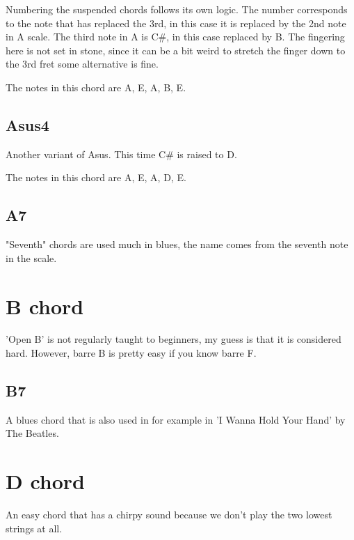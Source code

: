 \documentclass[11pt]{book}
\begin{document}
    Numbering the suspended chords follows its own logic.
    The number corresponds to the note that has replaced the 3rd, in this case it is replaced by the 2nd note in A scale.
    The third note in A is C\#, in this case replaced by B.
    The fingering here is not set in stone, since it can be a bit weird to stretch the finger down to the 3rd fret some alternative is fine.


    \chordscheme[
    name = Asus2,
    finger = {2/4:2,2/3:3},
    mute = {6},
    ring = {5,2,1}
    ]

    The notes in this chord are A, E, A, B, E.

    \subsection{Asus4}
    Another variant of Asus.
    This time C\# is raised to D.

    \chordscheme[
    name = Asus4,
    finger = {2/4:2, 2/3:3, 3/2:(3/4)},
    mute = {6},
    ring = {5,1}
    ]

    The notes in this chord are A, E, A, D, E.

    \subsection{A7}
    "Seventh" chords are used much in blues, the name comes from the seventh note in the scale.

    \chordscheme[
    name = A7,
    finger = {2/4:2, 3/2:4},
    mute = {6},
    ring = {5,3,1}
    ]


    \section{B chord}
    'Open B' is not regularly taught to beginners, my guess is that it is considered hard.
    However, barre B is pretty easy if you know barre F.

    \subsection{B7}
    A blues chord that is also used in for example in 'I Wanna Hold Your Hand' by The Beatles.

    \chordscheme[
    name = B7,
    finger = {2/5:1, 1/4:2, 2/3:3, 2/1:4},
    mute = {6},
    ring = {2}
    ]


    \section{D chord}
    An easy chord that has a chirpy sound because we don't play the two lowest strings at all.
\end{document}
